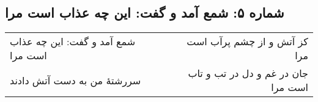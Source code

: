 \begin{center}
\section*{شماره ۵: شمع آمد و گفت: این چه عذاب است مرا}
\label{sec:005}
\begin{longtable}{l p{0.5cm} r}
شمع آمد و گفت: این چه عذاب است مرا
&&
کز آتش و از چشم پرآب است مرا
\\
سررشتهٔ من به دست آتش دادند
&&
جان در غم و دل در تب و تاب است مرا
\\
\end{longtable}
\end{center}
